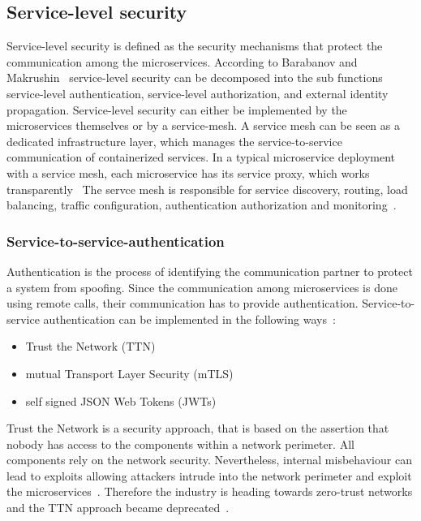 \subsection{Service-level security}
Service-level security is defined as the security mechanisms that protect the communication among the microservices.
According to Barabanov and Makrushin~\cite{barabanov2020authentication} service-level security can be decomposed into the sub functions service-level authentication, service-level authorization, and external identity propagation.
Service-level security can either be implemented by the microservices themselves or by a service-mesh.
A service mesh can be seen as a dedicated infrastructure layer, which manages the service-to-service communication of containerized services.
In a typical microservice deployment with a service mesh, each microservice has its service proxy, which works transparently~\cite{dias2020microservices}
The servce mesh is responsible for service discovery, routing, load balancing, traffic configuration, authentication authorization and monitoring~\cite{chandramouli2019microservices}.

\subsubsection{Service-to-service-authentication} 
\label{sec:service-to-service-authentication}
Authentication is the process of identifying the communication partner to protect a system from spoofing.
Since the communication among microservices is done using remote calls, their communication has to provide authentication.
Service-to-service authentication can be implemented in the following ways~\cite{dias2020microservices}:
\begin{itemize}
    \item Trust the Network (TTN)
    \item mutual Transport Layer Security (mTLS)
    \item self signed JSON Web Tokens (JWTs)
\end{itemize}
Trust the Network is a security approach, that is based on the assertion that nobody has access to the components within a network perimeter.
All components rely on the network security.
Nevertheless, internal misbehaviour can lead to exploits allowing attackers intrude into the network perimeter and exploit the microservices~\cite{zaheer2019eztrust}. 
Therefore the industry is heading towards zero-trust networks and the TTN approach became deprecated~\cite{dias2020microservices}.

